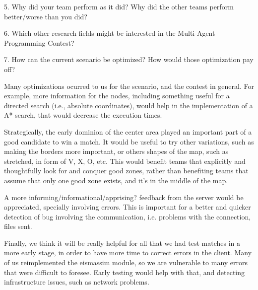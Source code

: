 \documentclass{llncs2e/llncs}
\begin{document}
5. Why did your team perform as it did? Why did the other teams perform 
better/worse than you did?

6. Which other research fields might be interested in the Multi-Agent 
Programming Contest?


7. How can the current scenario be optimized? How would those optimization pay 
off?

    Many optimizations ocurred to us for the scenario, and the contest in general. 
    For example, more information for the nodes, including something useful for a 
    directed search (i.e., absolute coordinates), would help in the implementation 
    of a A* search, that would decrease the execution times.

    Strategically, the early dominion of the center area played an important part 
    of a good candidate to win a match. It would be useful to try other 
    variations, such as making the borders more important, or others shapes of the 
    map, such as stretched, in form of V, X, O, etc. This would benefit teams that 
    explicitly and thoughtfully look for and conquer good zones, rather than 
    benefiting teams that assume that only one good zone exists, and it's in the 
    middle of the map.

    A more informing/informational/apprising? feedback from the server would be 
    appreciated, specially involving errors. This is important for a better and 
    quicker detection of bug involving the communication, i.e. problems with the 
    connection, files sent.

    Finally, we think it will be really helpful for all that we had test matches 
    in a more early stage, in order to have more time to correct errors in the 
    client. Many of us reimplemented the eismassim module, so we are vulnerable to 
    many errors that were difficult to foresee. Early testing would help with 
    that, and detecting infrastructure issues, such as network problems.
    
\end{document}
